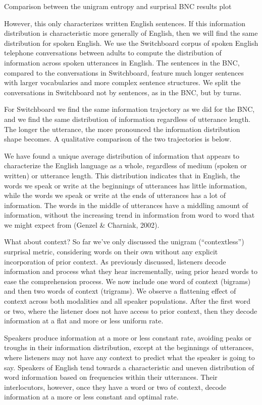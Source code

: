 \documentclass[11pt,]{article}
\begin{document}
Comparison between the unigram entropy and surprisal BNC results plot

However, this only characterizes written English sentences. If this information distribution is characteristic more generally of English, then we will find the same distribution for spoken English. We use the Switchboard corpus of spoken English telephone conversations between adults to compute the distribution of information across spoken utterances in English. The sentences in the BNC, compared to the conversations in Switchboard, feature much longer sentences with larger vocabularies and more complex sentence structures. We split the conversations in Switchboard not by sentences, as in the BNC, but by turns.

For Switchboard we find the same information trajectory as we did for the BNC, and we find the same distribution of information regardless of utterance length. The longer the utterance, the more pronounced the information distribution shape becomes. A qualitative comparison of the two trajectories is below.

We have found a unique average distribution of information that appears to characterize the English language as a whole, regardless of medium (spoken or written) or utterance length. This distribution indicates that in English, the words we speak or write at the beginnings of utterances has little information, while the words we speak or write at the ends of utterances has a lot of information. The words in the middle of utterances have a middling amount of information, without the increasing trend in information from word to word that we might expect from (Genzel \& Charniak, 2002).

What about context? So far we've only discussed the unigram (``contextless'') surprisal metric, considering words on their own without any explicit incorporation of prior context. As previously discussed, listeners decode information and process what they hear incrementally, using prior heard words to ease the comprehension process. We now include one word of context (bigrams) and then two words of context (trigrams). We observe a flattening effect of context across both modalities and all speaker populations. After the first word or two, where the listener does not have access to prior context, then they decode information at a flat and more or less uniform rate.

Speakers produce information at a more or less constant rate, avoiding peaks or troughs in their information distribution, except at the beginnings of utterances, where listeners may not have any context to predict what the speaker is going to say. Speakers of English tend towards a characteristic and uneven distribution of word information based on frequencies within their utterances. Their interlocutors, however, once they have a word or two of context, decode information at a more or less constant and optimal rate.
\end{document}
